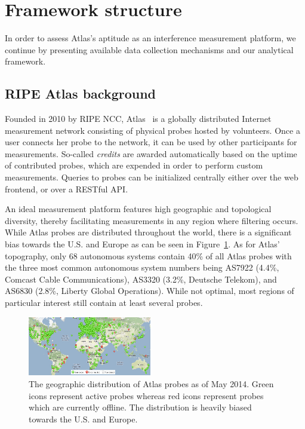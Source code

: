 \section{Framework structure}
\label{sec:framework}
In order to assess Atlas's aptitude as an interference measurement platform, we
continue by presenting available data collection mechanisms and our analytical framework.

\subsection{RIPE Atlas background}
Founded in 2010 by RIPE NCC, Atlas~\cite{atlas} is a globally
distributed Internet measurement network consisting of physical probes hosted
by volunteers.  Once a user connects her probe to the network, it can be used
by other participants for measurements. So-called \emph{credits} are awarded
automatically based on the uptime of contributed probes, which are expended in
order to perform custom measurements. Queries to probes can be initialized
centrally either over the web frontend, or over a RESTful API.

An ideal measurement platform features high geographic and
topological diversity, thereby facilitating measurements in any region where
filtering occurs.  While Atlas probes are distributed throughout the world,
there is a significant bias towards the U.S. and Europe as can be seen in
Figure~\ref{fig:probe_distribution}.  As for Atlas' topography, only 68
autonomous systems contain 40\% of all Atlas probes with the three most common
autonomous system numbers being AS7922 (4.4\%, Comcast Cable Communications),
AS3320 (3.2\%, Deutsche Telekom), and AS6830 (2.8\%, Liberty Global Operations).
While not optimal, most regions of particular interest still contain at least several
probes.

\begin{figure}[t]
\centering
\includegraphics[width=0.48\textwidth]{diagrams/probe_distribution.jpg}
\caption{The geographic distribution of Atlas probes as of May 2014.  Green
icons represent active probes whereas red icons represent probes which are
currently offline.  The distribution is heavily biased towards the U.S. and
Europe.} \label{fig:probe_distribution}
\end{figure}

